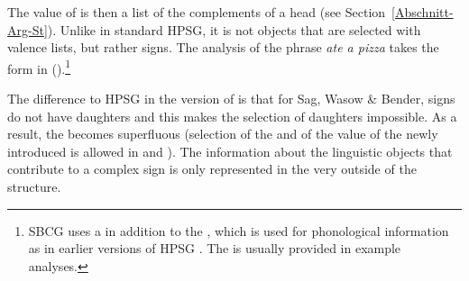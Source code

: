 \noindent
The value of \comps{} is then a list of the complements of a head (see Section~\ref{Abschnitt-Arg-St}).
Unlike in standard HPSG\indexhpsg, it is not  objects that are selected with valence lists, but rather signs.
The analysis of the phrase \emph{ate a pizza} takes the form in ().\footnote{
  SBCG uses a \formf in addition to the \phonf, which is used for phonological information as in
  earlier versions of HPSG \citep[Section~3.1, Section~3.6]{Sag2012a}. The \formf is usually provided in example analyses.
}
\begin{figure}
\ea
\label{feat-geom-swb}
\z
\vspace{-\baselineskip}
\end{figure}%
The difference to HPSG in the version of \citet{ps2} is that for Sag, Wasow \& Bender, signs do not have
daughters and this makes the selection of daughters impossible.
As a result, the \synsemf{} becomes superfluous (selection of the \phonv and of the
value of the newly introduced \formf is allowed in  and ).
The information about the linguistic objects that contribute to a complex sign is only represented in the very outside of the structure.
